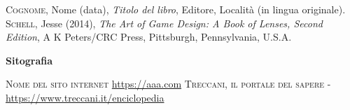 
\pagestyle{empty}

\begin{thebibliography}{9}
        \textsc{Cognome}, Nome (data), \emph{Titolo del libro}, Editore, Località (in lingua originale).
        \textsc{Schell}, Jesse (2014), \emph{The Art of Game Design: A Book of Lenses, Second Edition}, A K Peters/CRC Press, Pittsburgh, Pennsylvania, U.S.A.
     

\vspace*{0.5cm}


\clearpage

        
\noindent \Huge{\textbf{Sitografia}}
\normalsize

\vspace*{0.3cm}
               \textsc{Nome del sito internet}  \url{https://aaa.com}
        \textsc{Treccani, il portale del sapere}  -  \url{https://www.treccani.it/enciclopedia}
     
        
        
\end{thebibliography}